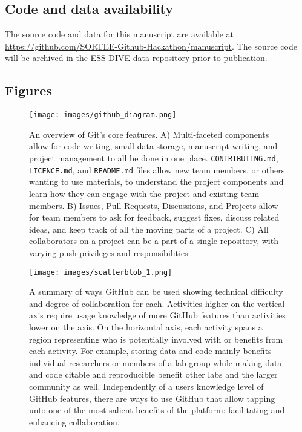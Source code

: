 \hypertarget{code-and-data-availability}{%
\subsection{Code and data availability}\label{code-and-data-availability}}

The source code and data for this manuscript are available at \url{https://github.com/SORTEE-Github-Hackathon/manuscript}.
The source code will be archived in the ESS-DIVE data repository prior to publication.

\hypertarget{figures}{%
\subsection{Figures}\label{figures}}

\begin{figure}
\hypertarget{fig:github-diagram}{%
\centering
\texttt{[image: images/github\_diagram.png]}
\caption{An overview of Git's core features. A) Multi-faceted components allow for code writing, small data storage, manuscript writing, and project management to all be done in one place. \texttt{CONTRIBUTING.md}, \texttt{LICENCE.md}, and \texttt{README.md} files allow new team members, or others wanting to use materials, to understand the project components and learn how they can engage with the project and existing team members. B) Issues, Pull Requests, Discussions, and Projects allow for team members to ask for feedback, suggest fixes, discuss related ideas, and keep track of all the moving parts of a project. C) All collaborators on a project can be a part of a single repository, with varying push privileges and responsibilities}\label{fig:github-diagram}
}
\end{figure}

\begin{figure}
\hypertarget{fig:scatterblob}{%
\centering
\texttt{[image: images/scatterblob\_1.png]}
\caption{A summary of ways GitHub can be used showing technical difficulty and degree of collaboration for each. Activities higher on the vertical axis require usage knowledge of more GitHub features than activities lower on the axis. On the horizontal axis, each activity spans a region representing who is potentially involved with or benefits from each activity. For example, storing data and code mainly benefits individual researchers or members of a lab group while making data and code citable and reproducible benefit other labs and the larger community as well. Independently of a users knowledge level of GitHub features, there are ways to use GitHub that allow tapping unto one of the most salient benefits of the platform: facilitating and enhancing collaboration.}\label{fig:scatterblob}
}
\end{figure}

